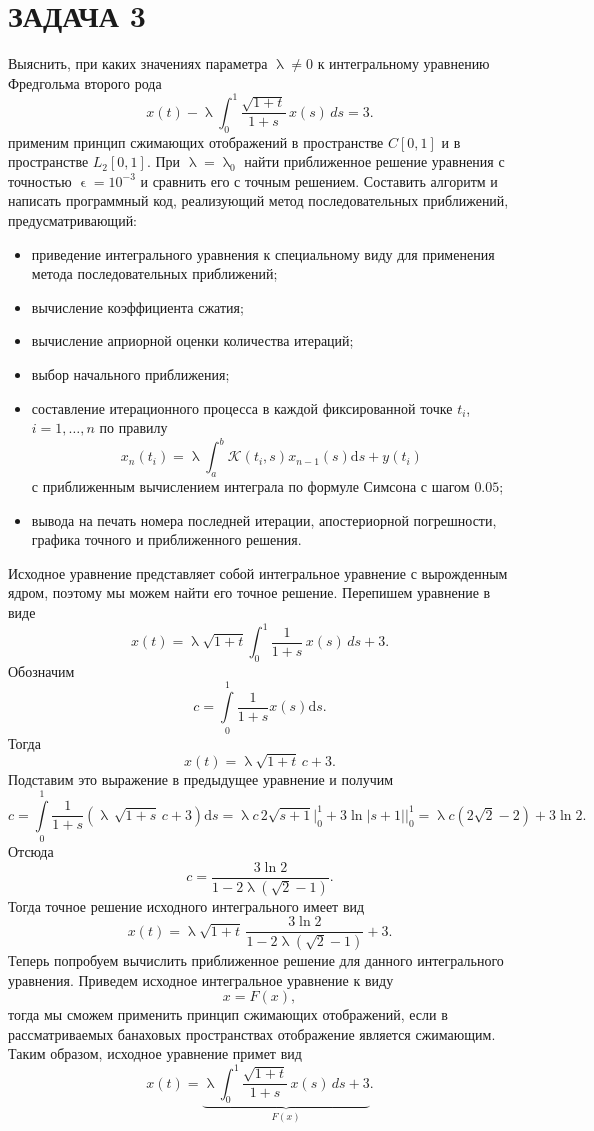 \documentclass[a4paper, 12pt]{report}
\renewcommand{\lambda}{\uplambda}
\renewcommand{\epsilon}{\upvarepsilon}
\begin{document}
		\section*{ЗАДАЧА 3}
		Выяснить, при каких значениях параметра $\lambda \ne 0$ к интегральному уравнению Фредгольма второго рода
		$$
        x(t) - \lambda \int_{0}^{1} \frac{\sqrt{1 + t}}{1 + s} \, x(s) \, ds = 3.
		$$
		применим принцип сжимающих отображений в пространстве $C[0,1]$ и в пространстве $L_2[0,1]$. При $\lambda = \lambda_0$ найти приближенное решение уравнения с точностью $\epsilon = 10^{-3}$ и сравнить его с точным решением. Составить алгоритм и написать программный код, реализующий метод последовательных приближений, предусматривающий:
		\begin{itemize}
			\item приведение интегрального уравнения к специальному виду для применения метода последовательных приближений;
			\item вычисление коэффициента сжатия;
			\item вычисление априорной оценки количества итераций;
			\item выбор начального приближения;
			\item составление итерационного процесса в каждой фиксированной точке $t_i$, $i=1,\ldots, n$ по правилу $$x_{n}\left(t_{i}\right)=\lambda \int_{a}^{b} \mathcal{K}\left(t_{i}, s\right) x_{n-1}\left(s\right) \mathrm{d} s+y\left(t_{i}\right)$$
			с приближенным вычислением интеграла по формуле Симсона с шагом $0.05$;
			\item вывода на печать номера последней итерации, апостериорной погрешности, графика точного и приближенного решения.
		\end{itemize}
		Исходное уравнение представляет собой интегральное уравнение с вырожденным ядром, поэтому мы можем найти его точное решение. Перепишем уравнение в виде $$x(t) = \lambda \sqrt{1 + t}\int_{0}^{1} \frac{1}{1 + s} \, x(s) \, ds + 3.$$
		Обозначим $$c = \int\limits_0^1 \frac{1}{1 + s} x(s)\mathrm{d} s. $$
		Тогда $$x(t) = \lambda \sqrt{1 + t} \, c + 3.$$
		Подставим это выражение в предыдущее уравнение и получим $$c = \int\limits_0^1 \frac{1}{1 + s}(\lambda \, \sqrt{1 + s} \, c + 3)\mathrm{d} s = \lambda c \, 2\sqrt{s + 1}\Big|_0^1 + 3\ln{|s + 1|}\Big|_0^1 = \lambda c (2 \sqrt{2} - 2) + 3 \ln{2}.$$
		Отсюда $$c = \dfrac{3 \ln{2}}{1 - 2 \lambda (\sqrt{2} - 1)}.$$
		Тогда точное решение исходного интегрального имеет вид $$x(t) = \lambda \sqrt{1 + t} \, \dfrac{3 \ln{2}}{1 - 2 \lambda (\sqrt{2} - 1)} + 3.$$
		Теперь попробуем вычислить приближенное решение для данного интегрального уравнения.
		Приведем исходное интегральное уравнение к виду $$x = F(x),$$ тогда мы сможем применить принцип сжимающих отображений, если в рассматриваемых банаховых пространствах отображение является сжимающим. Таким образом, исходное уравнение примет вид $$x(t) =\underbrace{\lambda \int_{0}^{1} \frac{\sqrt{1 + t}}{1 + s} \, x(s) \, ds + 3}_{F(x)}.$$
\end{document}
